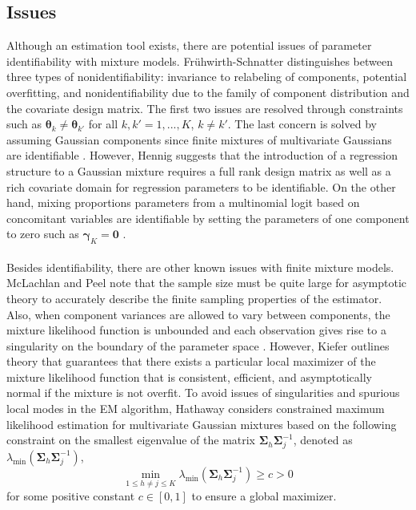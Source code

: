 \documentclass[10pt]{article}
\newcommand{\bs}[0]{\boldsymbol}
\begin{document}
\subsection{Issues}
Although an estimation tool exists, there are potential issues of parameter identifiability with mixture models. Fr{\"u}hwirth-Schnatter \cite{fruhwirth2006} distinguishes between three types of nonidentifiability: invariance to  relabeling of components, potential overfitting, and nonidentifiability due to the family of component distribution and the covariate design matrix. The first two issues are resolved through constraints such as $\bs\theta_{k}\not=\bs\theta_{k'}$ for all $k,k'=1,...,K$, $k\not=k'$. The last concern is solved by assuming Gaussian components since finite mixtures of multivariate Gaussians are identifiable \cite{teicher1963,yakowitz1968}. However, Hennig \cite{hennig2000} suggests that the introduction of a regression structure to a Gaussian mixture requires a full rank design matrix as well as a rich covariate domain for regression parameters to be identifiable. On the other hand, mixing proportions parameters from a multinomial logit based on concomitant variables are identifiable by setting the parameters of one component to zero such as $\bs\gamma_{K}=\bs0$ \cite{jiang1999}.\\\\
Besides identifiability, there are other known issues with finite mixture models. McLachlan and Peel \cite{mclachlan2000} note that the sample size must be quite large for asymptotic theory to accurately describe the finite sampling properties of the estimator. Also, when component variances are allowed to vary between components, the mixture likelihood function is unbounded and each observation gives rise to a singularity on the boundary of the parameter space \cite{day1969,kiefer1956}. However, Kiefer \cite{kiefer1978} outlines theory that guarantees that there exists a particular local maximizer of the mixture likelihood function that is consistent, efficient, and asymptotically normal if the mixture is not overfit. To avoid issues of singularities and spurious local modes in the EM algorithm, Hathaway \cite{hathaway1985} considers constrained maximum likelihood estimation for multivariate Gaussian mixtures based on the following constraint on the smallest eigenvalue of the matrix $\bs\Sigma_{h}\bs\Sigma_{j}^{-1}$, denoted as $\lambda_{\text{min}}(\bs\Sigma_{h}\bs\Sigma_{j}^{-1})$,
$$\min_{1\leq h\not=j\leq K}\lambda_{\text{min}}(\bs\Sigma_{h}\bs\Sigma_{j}^{-1})\geq c > 0$$ for some positive constant $c\in[0,1]$ to ensure a global maximizer. 
\end{document}

